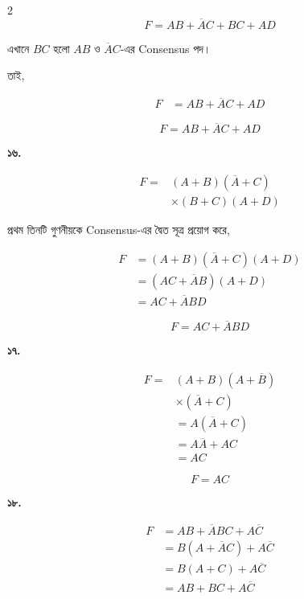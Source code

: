 \begin{multicols}{2}
\[
F=AB+\overline AC+BC+AD
\]

এখানে \(BC\) হলো \(AB\) ও \(\overline AC\)-এর
\textenglish{Consensus} পদ।

তাই,

\[
\begin{aligned}
F
&=AB+\overline AC+AD
\end{aligned}
\]

\[
\boxed{F=AB+\overline AC+AD}
\]

\medskip


\textbf{১৬.}

\[
\begin{aligned}
F
={}&(A+B)(\overline A+C)\\
&\times(B+C)(A+D)
\end{aligned}
\]

প্রথম তিনটি গুণনীয়কে
\textenglish{Consensus}-এর দ্বৈত সূত্র প্রয়োগ করে,

\[
\begin{aligned}
F
&=(A+B)(\overline A+C)(A+D)\\
&=(AC+\overline AB)(A+D)\\
&=AC+\overline ABD
\end{aligned}
\]

\[
\boxed{F=AC+\overline ABD}
\]

\medskip


\textbf{১৭.}

\[
\begin{aligned}
F
={}&(A+B)(A+\overline B)\\
&\times(\overline A+C)\\
&=A(\overline A+C)\\
&=A\overline A+AC\\
&=AC
\end{aligned}
\]

\[
\boxed{F=AC}
\]

\medskip


\textbf{১৮.}

\[
\begin{aligned}
F
&=AB+\overline ABC+A\overline C\\
&=B(A+\overline AC)+A\overline C\\
&=B(A+C)+A\overline C\\
&=AB+BC+A\overline C
\end{aligned}
\]


\end{multicols}
